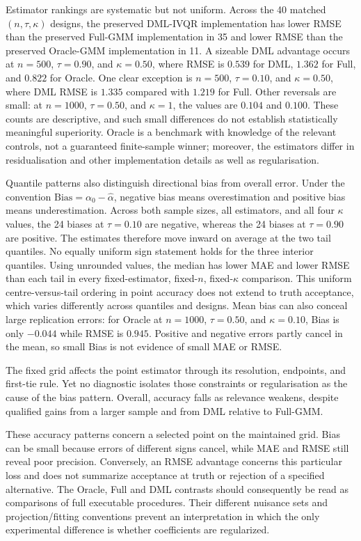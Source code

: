 Estimator rankings are systematic but not uniform. Across the 40 matched $(n,\tau,\kappa)$ designs, the preserved DML-IVQR implementation has lower RMSE than the preserved Full-GMM implementation in 35 and lower RMSE than the preserved Oracle-GMM implementation in 11. A sizeable DML advantage occurs at $n=500$, $\tau=0.90$, and $\kappa=0.50$, where RMSE is $0.539$ for DML, $1.362$ for Full, and $0.822$ for Oracle. One clear exception is $n=500$, $\tau=0.10$, and $\kappa=0.50$, where DML RMSE is $1.335$ compared with $1.219$ for Full. Other reversals are small: at $n=1000$, $\tau=0.50$, and $\kappa=1$, the values are $0.104$ and $0.100$. These counts are descriptive, and such small differences do not establish statistically meaningful superiority. Oracle is a benchmark with knowledge of the relevant controls, not a guaranteed finite-sample winner; moreover, the estimators differ in residualisation and other implementation details as well as regularisation.

Quantile patterns also distinguish directional bias from overall error. Under the convention $\mathrm{Bias}=\alpha_0-\widehat\alpha$, negative bias means overestimation and positive bias means underestimation. Across both sample sizes, all estimators, and all four $\kappa$ values, the 24 biases at $\tau=0.10$ are negative, whereas the 24 biases at $\tau=0.90$ are positive. The estimates therefore move inward on average at the two tail quantiles. No equally uniform sign statement holds for the three interior quantiles. Using unrounded values, the median has lower MAE and lower RMSE than each tail in every fixed-estimator, fixed-$n$, fixed-$\kappa$ comparison. This uniform centre-versus-tail ordering in point accuracy does not extend to truth acceptance, which varies differently across quantiles and designs. Mean bias can also conceal large replication errors: for Oracle at $n=1000$, $\tau=0.50$, and $\kappa=0.10$, Bias is only $-0.044$ while RMSE is $0.945$. Positive and negative errors partly cancel in the mean, so small Bias is not evidence of small MAE or RMSE.

The fixed grid affects the point estimator through its resolution, endpoints, and first-tie rule. Yet no diagnostic isolates those constraints or regularisation as the cause of the bias pattern. Overall, accuracy falls as relevance weakens, despite qualified gains from a larger sample and from DML relative to Full-GMM.

These accuracy patterns concern a selected point on the maintained grid. Bias can be small because errors of different signs cancel, while MAE and RMSE still reveal poor precision. Conversely, an RMSE advantage concerns this particular loss and does not summarize acceptance at truth or rejection of a specified alternative. The Oracle, Full and DML contrasts should consequently be read as comparisons of full executable procedures. Their different nuisance sets and projection/fitting conventions prevent an interpretation in which the only experimental difference is whether coefficients are regularized.

